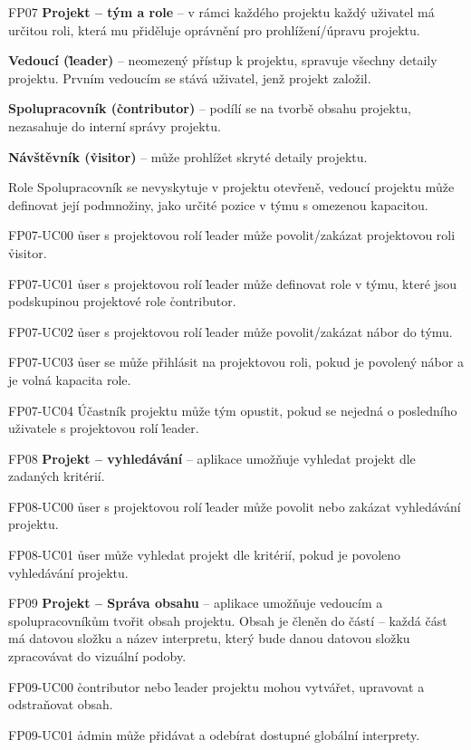 \begin{dl}
   \item[FP07]
   \textbf{Projekt – tým a role} – v rámci každého projektu každý uživatel má určitou roli, která mu přiděluje oprávnění pro prohlížení/úpravu projektu.
   \begin{ul}
      \item
      \textbf{Vedoucí (\h{leader})} – neomezený přístup k projektu, spravuje všechny detaily projektu.
      Prvním vedoucím se stává uživatel, jenž projekt založil.
      \item
      \textbf{Spolupracovník (\h{contributor})} – podílí se na tvorbě obsahu projektu, nezasahuje do interní správy projektu.
      \item
      \textbf{Návštěvník (\h{visitor})} – může prohlížet skryté detaily projektu.
   \end{ul}
   Role Spolupracovník se nevyskytuje v projektu otevřeně, vedoucí projektu může definovat její podmnožiny, jako určité pozice v týmu s omezenou kapacitou.
   \begin{dl}
      \item[FP07-UC00] \h{user} s projektovou rolí \h{leader} může povolit/zakázat projektovou roli \h{visitor}.
      \item[FP07-UC01] \h{user} s projektovou rolí \h{leader} může definovat role v týmu, které jsou podskupinou projektové role \h{contributor}.
      \item[FP07-UC02] \h{user} s projektovou rolí \h{leader} může povolit/zakázat nábor do týmu.
      \item[FP07-UC03] \h{user} se může přihlásit na projektovou roli, pokud je povolený nábor a je volná kapacita role.
      \item[FP07-UC04] Účastník projektu může tým opustit, pokud se nejedná o posledního uživatele s projektovou rolí \h{leader}.
   \end{dl}

   \item[FP08]
   \textbf{Projekt – vyhledávání} – aplikace umožňuje vyhledat projekt dle zadaných kritérií.
   \begin{dl}
      \item[FP08-UC00] \h{user} s projektovou rolí \h{leader} může povolit nebo zakázat vyhledávání projektu.
      \item[FP08-UC01] \h{user} může vyhledat projekt dle kritérií, pokud je povoleno vyhledávání projektu.
   \end{dl}

   \item[FP09]
   \textbf{Projekt – Správa obsahu} – aplikace umožňuje vedoucím a spolupracovníkům tvořit obsah projektu.
   Obsah je členěn do částí – každá část má datovou složku a název interpretu, který bude danou datovou složku zpracovávat do vizuální podoby.
   \begin{dl}
      \item[FP09-UC00] \h{contributor} nebo \h{leader} projektu mohou vytvářet, upravovat a odstraňovat obsah.
      \item[FP09-UC01] \h{admin} může přidávat a odebírat dostupné globální interprety.
   \end{dl}
\end{dl}



